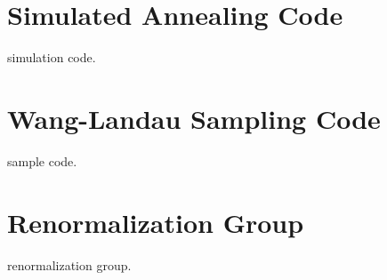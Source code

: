 \section{Simulated Annealing Code}
simulation code.


\section{Wang-Landau Sampling Code}
sample code.


\section{Renormalization Group}
renormalization group.